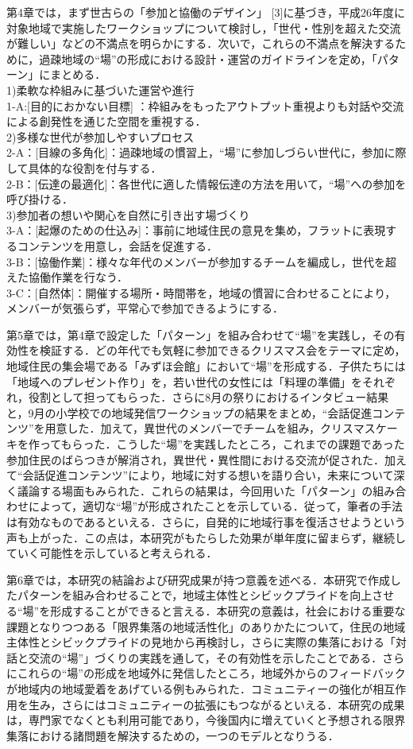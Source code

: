 \documentclass[a4paper]{jsarticle}
\begin{document}
第4章では，まず世古らの「参加と協働のデザイン」 [3]に基づき，平成26年度に対象地域で実施したワークショップについて検討し，「世代・性別を超えた交流が難しい」などの不満点を明らかにする．次いで，これらの不満点を解決するために，過疎地域の“場”の形成における設計・運営のガイドラインを定め，「パターン」にまとめる．\\
1)柔軟な枠組みに基づいた運営や進行\\
1-A:[目的におかない目標] ：枠組みをもったアウトプット重視よりも対話や交流による創発性を通じた空間を重視する．\\
2)多様な世代が参加しやすいプロセス\\
2-A：[目線の多角化]：過疎地域の慣習上，“場”に参加しづらい世代に，参加に際して具体的な役割を付与する．\\
2-B：[伝達の最適化]：各世代に適した情報伝達の方法を用いて，“場”への参加を呼び掛ける．\\
3)参加者の想いや関心を自然に引き出す場づくり\\
3-A：[起爆のための仕込み]：事前に地域住民の意見を集め，フラットに表現するコンテンツを用意し，会話を促進する．\\
3-B：[協働作業]：様々な年代のメンバーが参加するチームを編成し，世代を超えた協働作業を行なう．\\
3-C：[自然体]：開催する場所・時間帯を，地域の慣習に合わせることにより，メンバーが気張らず，平常心で参加できるようにする．\par
 第5章では，第4章で設定した「パターン」を組み合わせて“場”を実践し，その有効性を検証する．どの年代でも気軽に参加できるクリスマス会をテーマに定め，地域住民の集会場である「みずほ会館」において“場”を形成する．子供たちには「地域へのプレゼント作り」を，若い世代の女性には「料理の準備」をそれぞれ，役割として担ってもらった．さらに8月の祭りにおけるインタビュー結果と，9月の小学校での地域発信ワークショップの結果をまとめ，“会話促進コンテンツ”を用意した．加えて，異世代のメンバーでチームを組み，クリスマスケーキを作ってもらった．こうした“場”を実践したところ，これまでの課題であった参加住民のばらつきが解消され，異世代・異性間における交流が促された．加えて“会話促進コンテンツ”により，地域に対する想いを語り合い，未来について深く議論する場面もみられた．これらの結果は，今回用いた「パターン」の組み合わせによって，適切な“場”が形成されたことを示している．従って，筆者の手法は有効なものであるといえる．さらに，自発的に地域行事を復活させようという声も上がった．この点は，本研究がもたらした効果が単年度に留まらず，継続していく可能性を示していると考えられる．\par
 第6章では，本研究の結論および研究成果が持つ意義を述べる．本研究で作成したパターンを組み合わせることで，地域主体性とシビックプライドを向上させる“場”を形成することができると言える．本研究の意義は，社会における重要な課題となりつつある「限界集落の地域活性化」のありかたについて，住民の地域主体性とシビックプライドの見地から再検討し，さらに実際の集落における「対話と交流の“場”」づくりの実践を通して，その有効性を示したことである．さらにこれらの“場”の形成を地域外に発信したところ，地域外からのフィードバックが地域内の地域愛着をあげている例もみられた．コミュニティーの強化が相互作用を生み，さらにはコミュニティーの拡張にもつながるといえる．本研究の成果は，専門家でなくとも利用可能であり，今後国内に増えていくと予想される限界集落における諸問題を解決するための，一つのモデルとなりうる．
\end{document}

